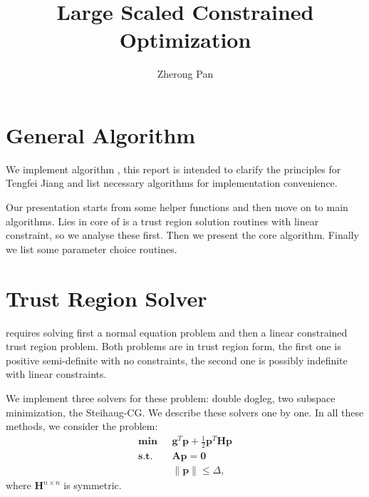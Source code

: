 \documentclass[annual]{acmsiggraph}
\title{Large Scaled Constrained Optimization}
\author{Zherong Pan}
\newcommand{\E}[1]{\mathbf{#1}}
\begin{document}
\maketitle

\section{General Algorithm}
We implement algorithm \cite{byrd2000trust}, this report is intended to clarify the principles for Tengfei Jiang and list necessary algorithms for implementation convenience. 

Our presentation starts from some helper functions and then move on to main algorithms. Lies in core of \cite{byrd2000trust} is a trust region solution routines with linear constraint, so we analyse these first. Then we present the core algorithm. Finally we list some parameter choice routines.

\section{Trust Region Solver}
\cite{byrd2000trust} requires solving first a normal equation problem and then a linear constrained trust region problem. Both problems are in trust region form, the first one is positive semi-definite with no constraints, the second one is possibly indefinite with linear constraints.

We implement three solvers for these problem: double dogleg, two subspace minimization, the Steihaug-CG. We describe these solvers one by one. In all these methods, we consider the problem:
\begin{subequations}
\label{pb:TR_PROB}
\begin{align}
\E{min}\text{ }&\E{g}^T\E{p}+\frac{1}{2}\E{p}^T\E{H}\E{p}	\\
\E{s.t.}\text{ }&\E{A}\E{p}=\E{0}	\\
\text{ }&\|\E{p}\|\leq\Delta,
\end{align}
\end{subequations}
where $\E{H}^{n\times n}$ is symmetric.
\end{document}
